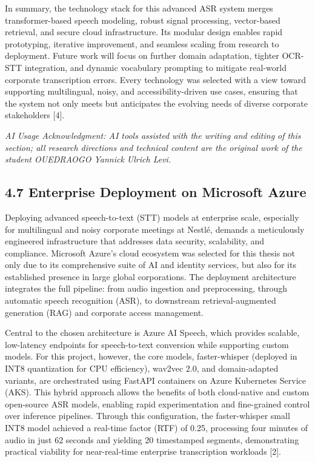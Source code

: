 \documentclass[12pt,a4paper]{article}
\begin{document}
In summary, the technology stack for this advanced ASR system merges transformer-based speech modeling, robust signal processing, vector-based retrieval, and secure cloud infrastructure. Its modular design enables rapid prototyping, iterative improvement, and seamless scaling from research to deployment. Future work will focus on further domain adaptation, tighter OCR-STT integration, and dynamic vocabulary prompting to mitigate real-world corporate transcription errors. Every technology was selected with a view toward supporting multilingual, noisy, and accessibility-driven use cases, ensuring that the system not only meets but anticipates the evolving needs of diverse corporate stakeholders [4].


\textit{AI Usage Acknowledgment: AI tools assisted with the writing and editing of this section; all research directions and technical content are the original work of the student OUEDRAOGO Yannick Ulrich Levi.}


\subsection{4.7 Enterprise Deployment on Microsoft Azure}


Deploying advanced speech-to-text (STT) models at enterprise scale, especially for multilingual and noisy corporate meetings at Nestlé, demands a meticulously engineered infrastructure that addresses data security, scalability, and compliance. Microsoft Azure’s cloud ecosystem was selected for this thesis not only due to its comprehensive suite of AI and identity services, but also for its established presence in large global corporations. The deployment architecture integrates the full pipeline: from audio ingestion and preprocessing, through automatic speech recognition (ASR), to downstream retrieval-augmented generation (RAG) and corporate access management.


Central to the chosen architecture is Azure AI Speech, which provides scalable, low-latency endpoints for speech-to-text conversion while supporting custom models. For this project, however, the core models, faster-whisper (deployed in INT8 quantization for CPU efficiency), wav2vec 2.0, and domain-adapted variants, are orchestrated using FastAPI containers on Azure Kubernetes Service (AKS). This hybrid approach allows the benefits of both cloud-native and custom open-source ASR models, enabling rapid experimentation and fine-grained control over inference pipelines. Through this configuration, the faster-whisper small INT8 model achieved a real-time factor (RTF) of 0.25, processing four minutes of audio in just 62 seconds and yielding 20 timestamped segments, demonstrating practical viability for near-real-time enterprise transcription workloads [2].
\end{document}
